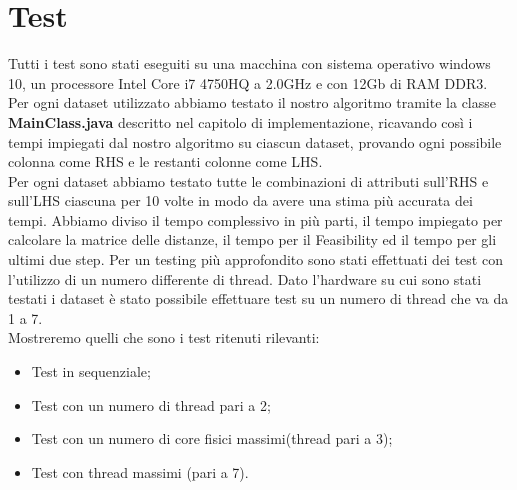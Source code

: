 \section{Test}
Tutti i test sono stati eseguiti su una macchina con sistema operativo windows 10, un processore Intel Core i7 4750HQ a 2.0GHz e con 12Gb di RAM DDR3.\\
Per ogni dataset utilizzato abbiamo testato il nostro algoritmo tramite la classe \textbf{MainClass.java} descritto nel capitolo di implementazione, ricavando così i tempi impiegati dal nostro algoritmo su ciascun dataset, provando ogni possibile colonna come RHS e le restanti colonne come LHS.  \\
Per ogni dataset abbiamo testato tutte le combinazioni di attributi sull'RHS e sull'LHS ciascuna per 10 volte in modo da avere una stima più accurata dei tempi. Abbiamo diviso il tempo complessivo in più parti, il tempo impiegato per calcolare la matrice delle distanze, il tempo per il Feasibility ed il tempo per gli ultimi due step. Per un testing più approfondito sono stati effettuati dei test con l'utilizzo di un numero differente di thread. Dato l'hardware su cui sono stati testati i dataset è stato possibile effettuare test su un numero di thread che va da 1 a 7.\\
Mostreremo quelli che sono i test ritenuti rilevanti:
\begin{itemize}
	\item Test in sequenziale;
	\item Test con un numero di thread pari a 2;
	\item Test con un numero di core fisici massimi(thread pari a 3);
	\item Test con thread massimi (pari a 7).
\end{itemize}
